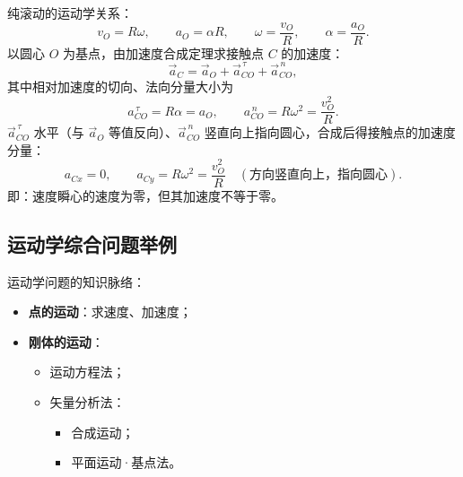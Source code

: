 \begin{solution}
纯滚动的运动学关系：
\begin{equation}\label{eq:9-rolling2-cond}
  v_O=R\omega,
  \qquad
  a_O=\alpha R,
  \qquad
  \omega=\frac{v_O}{R},
  \qquad
  \alpha=\frac{a_O}{R}.
\end{equation}
以圆心 $O$ 为基点，由加速度合成定理求接触点 $C$ 的加速度：
\begin{equation}\label{eq:9-ic-acc-decomp}
  \vec{a}_{C}=\vec{a}_O+\vec{a}_{CO}^{\,\tau}+\vec{a}_{CO}^{\,n},
\end{equation}
其中相对加速度的切向、法向分量大小为
\begin{equation}\label{eq:9-ic-acc-mag}
  a_{CO}^{\,\tau}=R\alpha=a_O,
  \qquad
  a_{CO}^{\,n}=R\omega^{2}=\frac{v_O^{2}}{R}.
\end{equation}
$\vec{a}_{CO}^{\,\tau}$ 水平（与 $\vec{a}_O$ 等值反向）、$\vec{a}_{CO}^{\,n}$ 竖直向上指向圆心，合成后得接触点的加速度分量：
\begin{equation}\label{eq:9-ic-acc-result}
  a_{Cx}=0,
  \qquad
  a_{Cy}=R\omega^{2}=\frac{v_O^{2}}{R}
  \quad(\text{方向竖直向上，指向圆心}).
\end{equation}
即：速度瞬心的速度为零，但其加速度不等于零。
\end{solution}

\subsection{运动学综合问题举例}

运动学问题的知识脉络：
\begin{itemize}
  \item \textbf{点的运动}：求速度、加速度；
  \item \textbf{刚体的运动}：
    \begin{itemize}
      \item 运动方程法；
      \item 矢量分析法：
        \begin{itemize}
          \item 合成运动；
          \item 平面运动·基点法。
        \end{itemize}
    \end{itemize}
\end{itemize}

